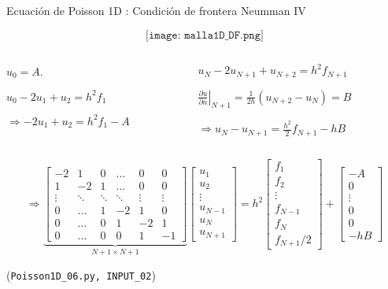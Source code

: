 \documentclass[handout]{beamer}
\begin{document}
\begin{frame}{Ecuaci\'on de Poisson 1D : Condici\'on de frontera Neumman IV}

$$\texttt{[image: malla1D\_DF.png]}$$
\begin{footnotesize}
\begin{columns}
\begin{column}{0.40\textwidth}
$ u_0  = A $.

$u_{0} - 2 u_{1} + u_{2} = h^2 f_1$ 

$\Rightarrow \boxed{-2 u_{1} + u_{2} = h^2 f_1 - A}$
\end{column}
\begin{column}{0.6\textwidth}
$u_{N} - 2u_{N+1} + u_{N+2} = h^2 f_{N+1}$

$\left.\displaystyle \frac{\partial u}{\partial n}\right|_{N+1}  = 
\frac{1}{2h}\left( u_{N+2} - u_{N} \right) = B$

$\Longrightarrow \boxed{u_{N} - u_{N+1} = \frac{h^2}{2} f_{N+1} - hB}$
\end{column}
\end{columns}

\pause


\[
\Longrightarrow
\underbrace{
\left[
  \begin{matrix}
    -2 & 1 & 0  & \dots & 0 & 0  \\
    1 & -2 & 1  & \dots & 0 & 0 \\
    \vdots & \ddots & \ddots & \ddots & \vdots & \vdots \\
    0 & \dots & 1 & -2 & 1 & 0 \\
    0 & \dots & 0 & 1 & -2 & 1 \\
    0 & \dots & 0 & 0 & 1 & -1        
  \end{matrix}
\right] 
}_{N+1 \times N+1}
\left[
\begin{matrix}
u_1 \\ u_2 \\ \vdots \\ u_{N-1} \\ u_N \\ u_{N+1}
\end{matrix}
\right]= 
h^2 \left[
\begin{matrix}
f_1 \\ f_2 \\ \vdots \\ f_{N-1} \\ f_N \\ f_{N+1}/2
\end{matrix}
\right] +
\left[
\begin{matrix}
-A \\ 0 \\  \vdots \\ 0 \\ 0 \\ -hB
\end{matrix}
\right]
\]

(\texttt{Poisson1D\_06.py, INPUT\_02})
\end{footnotesize}

\end{frame}
\end{document}
